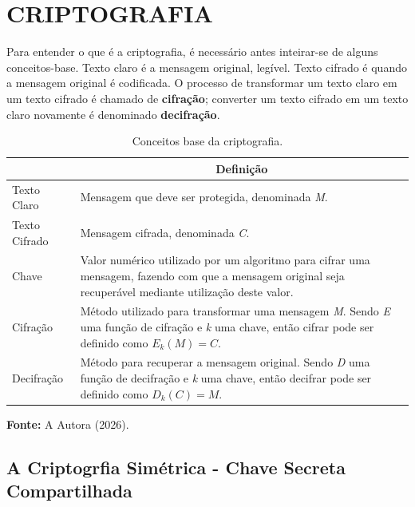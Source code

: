 \vspace{2.0cm}




\section{CRIPTOGRAFIA}

Para entender o que é a criptografia, é necessário antes inteirar-se de alguns conceitos-base. Texto claro é a mensagem original, legível. Texto cifrado é quando a mensagem original é codificada. O processo de transformar um texto claro em um texto cifrado é chamado de \textbf{cifração}; converter um texto cifrado em um texto claro novamente é denominado \textbf{decifração}.

\begin{table}[H]
    \centering
    \caption{Conceitos base da criptografia.}
    \label{conceitos_cripto}

    \begin{tabular}{|p{4cm}|p{10cm}|}
        \hline
        \rowcolor[HTML]{EFEFEF} 
        \multicolumn{1}{|c|}{\textbf{Conceito Base}} & \multicolumn{1}{c|}{\textbf{Definição}} \\ \hline
        Texto Claro & Mensagem que deve ser protegida, denominada \textit{M}. \\ \hline
        Texto Cifrado & Mensagem cifrada, denominada \textit{C}. \\ \hline
        Chave & Valor numérico utilizado por um algoritmo para cifrar uma mensagem, fazendo com que a mensagem original seja recuperável mediante utilização deste valor. \\ \hline
        Cifração & Método utilizado para transformar uma mensagem \textit{M}. Sendo \textit{E} uma função de cifração e \textit{k} uma chave, então cifrar pode ser definido como $E_k(M) = C$. \\ \hline
        Decifração & Método para recuperar a mensagem original. Sendo \textit{D} uma função de decifração e \textit{k} uma chave, então decifrar pode ser definido como $D_k(C) = M$. \\ \hline
    \end{tabular}

    \vspace{0.4cm}
    {\footnotesize \textbf{Fonte:} A Autora (2026).}
\end{table}




\subsection{A Criptogrfia Simétrica - Chave Secreta Compartilhada}


